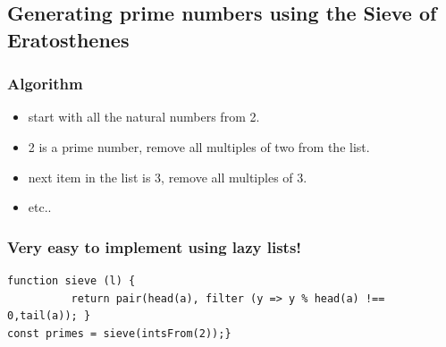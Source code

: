 \documentclass[12pt]{beamer}
\begin{document}
\subsection{Generating prime numbers using the Sieve of Eratosthenes}

\begin{frame}
\frametitle{Algorithm}
\begin{itemize}
    \item start with all the natural numbers from 2.
    \item 2 is a prime number, remove all multiples of two from the list.
    \item next item in the list is 3, remove all multiples of 3.
    \item etc..
\end{itemize}

\end{frame}

\begin{frame}[fragile]
\frametitle{Very easy to implement using lazy lists!}

\begin {lstlisting}
function sieve (l) { 
          return pair(head(a), filter (y => y %
const primes = sieve(intsFrom(2));}
\end{lstlisting}

\end{frame}
\end{document}

